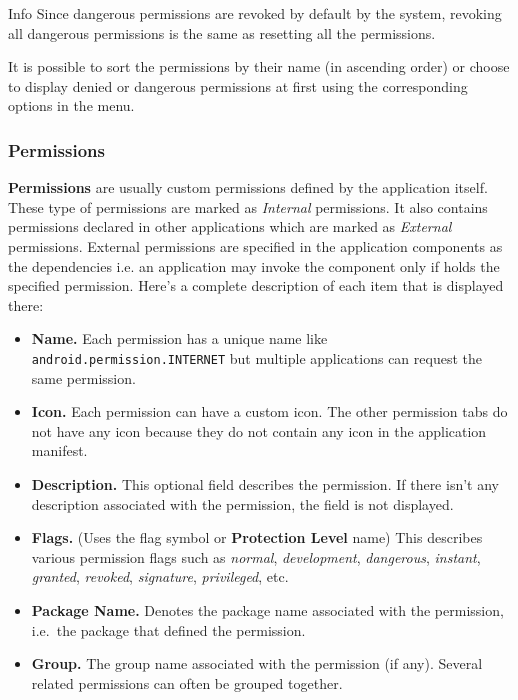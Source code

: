 \begin{tip}{Info}
    Since dangerous permissions are revoked by default by the system, revoking all dangerous permissions is the same as
    resetting all the permissions.
\end{tip}

It is possible to sort the permissions by their name (in ascending order) or choose to display denied or dangerous
permissions at first using the corresponding options in the menu.

\subsubsection{Permissions}\label{subsubsec:permissions} %
\textbf{Permissions} are usually custom permissions defined by the application itself. These type of permissions are
marked as \textit{Internal} permissions. It also contains permissions declared in other applications which are marked as
\textit{External} permissions. External permissions are specified in the application components as the dependencies i.e.
an application may invoke the component only if holds the specified permission. Here's a complete description of each
item that is displayed there:
\begin{itemize}
    \item \textbf{Name.} Each permission has a unique name like \texttt{android.permission.INTERNET} but multiple
    applications can request the same permission.

    \item \textbf{Icon.} Each permission can have a custom icon. The other permission tabs do not have any icon because
    they do not contain any icon in the application manifest.

    \item \textbf{Description.} This optional field describes the permission. If there isn't any description associated
    with the permission, the field is not displayed.

    \item \textbf{Flags.} (Uses the flag symbol or \textbf{Protection Level} name) This describes various permission
    flags such as \textit{normal}, \textit{development}, \textit{dangerous}, \textit{instant}, \textit{granted},
    \textit{revoked}, \textit{signature}, \textit{privileged}, etc.

    \item \textbf{Package Name.} Denotes the package name associated with the permission, i.e.\ the package that defined
    the permission.

    \item \textbf{Group.} The group name associated with the permission (if any). Several related permissions can often
    be grouped together.
\end{itemize}

